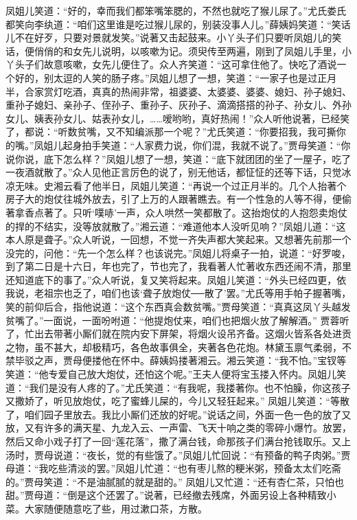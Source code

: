\begin{parag}


    凤姐儿笑道：“好的，幸而我们都笨嘴笨腮的，不然也就吃了猴儿尿了。”尤氏娄氏都笑向李纨道：“咱们这里谁是吃过猴儿尿的，别装没事人儿。”薛姨妈笑道：“笑话儿不在好歹，只要对景就发笑。”说著又击起鼓来。小丫头子们只要听凤姐儿的笑话，便俏俏的和女先儿说明，以咳嗽为记。须臾传至两遍，刚到了凤姐儿手里，小丫头子们故意咳嗽，女先儿便住了。众人齐笑道：“这可拿住他了。快吃了酒说一个好的，别太逗的人笑的肠子疼。”凤姐儿想了一想，笑道：“一家子也是过正月半，合家赏灯吃酒，真真的热闹非常，祖婆婆、太婆婆、婆婆、媳妇、孙子媳妇、重孙子媳妇、亲孙子、侄孙子、重孙子、灰孙子、滴滴搭搭的孙子、孙女儿、外孙女儿、姨表孙女儿、姑表孙女儿，……嗳哟哟，真好热闹！”众人听他说著，已经笑了，都说：“听数贫嘴，又不知编派那一个呢？”尤氏笑道：“你要招我，我可撕你的嘴。”凤姐儿起身拍手笑道：“人家费力说，你们混，我就不说了。”贾母笑道：“你说你说，底下怎么样？”凤姐儿想了一想，笑道：“底下就团团的坐了一屋子，吃了一夜酒就散了。”众人见他正言厉色的说了，别无他话，都怔怔的还等下话，只觉冰凉无味。史湘云看了他半日，凤姐儿笑道：“再说一个过正月半的。几个人抬著个房子大的炮仗往城外放去，引了上万的人跟著瞧去。有一个性急的人等不得，便偷著拿香点著了。只听‘噗哧’一声，众人哄然一笑都散了。这抬炮仗的人抱怨卖炮仗的捍的不结实，没等放就散了。”湘云道：“难道他本人没听见响？”凤姐儿道：“这本人原是聋子。”众人听说，一回想，不觉一齐失声都大笑起来。又想著先前那一个没完的，问他：“先一个怎么样？也该说完。”凤姐儿将桌子一拍，说道：“好罗唆，到了第二日是十六日，年也完了，节也完了，我看著人忙著收东西还闹不清，那里还知道底下的事了。”众人听说，复又笑将起来。凤姐儿笑道：“外头已经四更，依我说，老祖宗也乏了，咱们也该‘聋子放炮仗──散了’罢。”尤氏等用手帕子握著嘴，笑的前仰后合，指他说道：“这个东西真会数贫嘴。”贾母笑道：“真真这凤丫头越发贫嘴了。”一面说，一面吩咐道：“他提炮仗来，咱们也把烟火放了解解酒。” 贾蓉听了，忙出去带著小厮们就在院内安下屏架，将烟火设吊齐备。这烟火皆系各处进贡之物，虽不甚大，却极精巧，各色故事俱全，夹著各色花炮。林黛玉禀气柔弱，不禁毕驳之声，贾母便搂他在怀中。薛姨妈搂著湘云。湘云笑道：“我不怕。”宝钗等笑道：“他专爱自己放大炮仗，还怕这个呢。”王夫人便将宝玉搂入怀内。凤姐儿笑道：“我们是没有人疼的了。”尤氏笑道：“有我呢，我搂著你。也不怕臊，你这孩子又撒娇了，听见放炮仗，吃了蜜蜂儿屎的，今儿又轻狂起来。” 凤姐儿笑道：“等散了，咱们园子里放去。我比小厮们还放的好呢。”说话之间，外面一色一色的放了又放，又有许多的满天星、九龙入云、一声雷、飞天十响之类的零碎小爆竹。放罢，然后又命小戏子打了一回“莲花落”，撒了满台钱，命那孩子们满台抢钱取乐。又上汤时，贾母说道：“夜长，觉的有些饿了。”凤姐儿忙回说：“有预备的鸭子肉粥。”贾母道：“我吃些清淡的罢。”凤姐儿忙道：“也有枣儿熬的粳米粥，预备太太们吃斋的。”贾母笑道：“不是油腻腻的就是甜的。” 凤姐儿又忙道：“还有杏仁茶，只怕也甜。”贾母道：“倒是这个还罢了。”说著，已经撤去残席，外面另设上各种精致小菜。大家随便随意吃了些，用过漱口茶，方散。
\end{parag}


